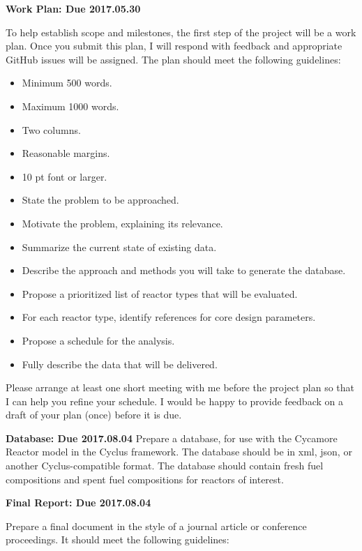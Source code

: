\documentclass[12pts, answers]{exam}
\newcommand{\duedate}{2017.08.04}
\begin{document}
\begin{questions}
\addpoints
\question[10] \textbf{Work Plan: Due 2017.05.30}

To help establish scope and milestones, the first step of the project will be a 
        work plan. Once you submit this plan, I will respond with feedback and 
        appropriate GitHub issues will be assigned. The plan should meet the 
        following guidelines:

\begin{itemize}
\item Minimum 500 words.
\item Maximum 1000 words.
\item Two columns.
\item Reasonable margins.
\item 10 pt font or larger.
\item State the problem to be approached.
\item Motivate the problem, explaining its relevance.
\item Summarize the current state of existing data. 
\item Describe the approach and methods you will take to generate the database.
\item Propose a prioritized list of reactor types that will be evaluated. 
\item For each reactor type, identify references for core design parameters.
\item Propose a schedule for the analysis.
\item Fully describe the data that will be delivered.
\end{itemize}

Please arrange at least one short meeting with me before the project plan
so that I can help you refine your schedule. I would be happy to provide feedback 
on a draft of your plan (once) before it is due.


\question[20] \textbf{Database: Due \duedate}
Prepare a database, for use with the Cycamore Reactor model in the Cyclus 
framework. The database should be in xml, json, or another Cyclus-compatible 
format. The database should contain fresh fuel compositions and spent fuel 
compositions for reactors of interest.

\question[60] \textbf{Final Report: Due \duedate}

Prepare a final document in the style of a journal article or conference 
proceedings. It should meet the following guidelines:


\end{questions}
\end{document}
